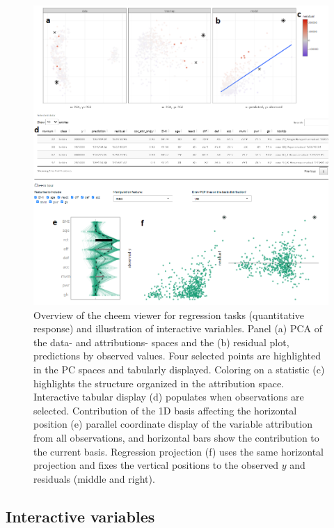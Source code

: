\documentclass[
]{article}
\begin{document}
\begin{figure}

{\centering \includegraphics[width=1\linewidth]{./figures/app_regression_interactions} 

}

\caption{Overview of the cheem viewer for regression tasks (quantitative response) and illustration of interactive variables. Panel (a) PCA of the data- and attributions- spaces and the (b) residual plot, predictions by observed values. Four selected points are highlighted in the PC spaces and tabularly displayed. Coloring on a statistic (c) highlights the structure organized in the attribution space. Interactive tabular display (d) populates when observations are selected. Contribution of the 1D basis affecting the horizontal position (e) parallel coordinate display of the variable attribution from all observations, and horizontal bars show the contribution to the current basis. Regression projection (f) uses the same horizontal projection and fixes the vertical positions to the observed $y$ and residuals (middle and right).}\label{fig:regressioncase}
\end{figure}

\hypertarget{interactive-variables}{%
\subsection{Interactive variables}\label{interactive-variables}}
\end{document}

